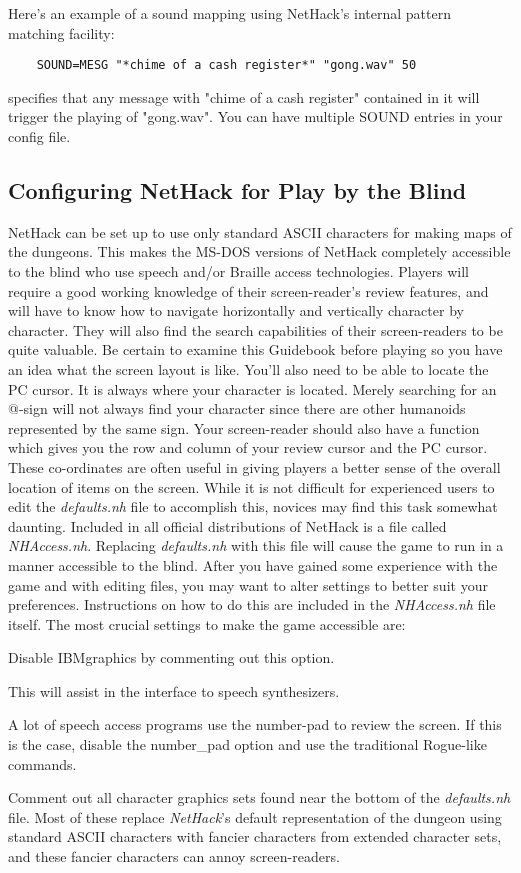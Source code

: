 Here's an example of a sound mapping using NetHack's internal
pattern matching facility:
\begin{verbatim}
    SOUND=MESG "*chime of a cash register*" "gong.wav" 50
\end{verbatim}
specifies that any message with "chime of a cash register" contained
in it will trigger the playing of "gong.wav".  You can have multiple
SOUND entries in your config file.

\subsection*{Configuring NetHack for Play by the Blind}

NetHack can be set up to use only standard ASCII characters for making
maps of the dungeons. This makes the MS-DOS versions of NetHack completely
accessible to the blind who use speech and/or Braille access technologies.
Players will require a good working knowledge of their screen-reader's
review features, and will have to know how to navigate horizontally and
vertically character by character. They will also find the search
capabilities of their screen-readers to be quite valuable. Be certain to
examine this Guidebook before playing so you have an idea what the screen
layout is like. You'll also need to be able to locate the PC cursor. It is
always where your character is located. Merely searching for an @-sign will
not always find your character since there are other humanoids represented
by the same sign. Your screen-reader should also have a function which
gives you the row and column of your review cursor and the PC cursor.
These co-ordinates are often useful in giving players a better sense of the
overall location of items on the screen.
While it is not difficult for experienced users to edit the {\it defaults.nh\/}
file to accomplish this, novices may find this task somewhat daunting.
Included in all official distributions of NetHack is a file called
{\it NHAccess.nh\/}.  Replacing {\it defaults.nh\/} with this file will cause
the game to run in a manner accessible to the blind. After you have gained
some experience with the game and with editing files, you may want to alter
settings to better suit your preferences. Instructions on how to do this
are included in the {\it NHAccess.nh\/} file itself. The most crucial
settings to make the game accessible are:
\blist{}
\item[\ib{IBMgraphics}]
Disable IBMgraphics by commenting out this option.
\item[\ib{menustyle:traditional}]
This will assist in the interface to speech synthesizers.
\item[\ib{number\_pad}]
A lot of speech access programs use the number-pad to review the screen.
If this is the case, disable the number\_pad option and use the traditional
Rogue-like commands.
\item[\ib{Character graphics}]
Comment out all character graphics sets found near the bottom of the
{\it defaults.nh\/} file.  Most of these replace {\it NetHack\/}'s
default representation of the dungeon using standard ASCII characters
with fancier characters from extended character sets, and these fancier
characters can annoy screen-readers.
\elist

